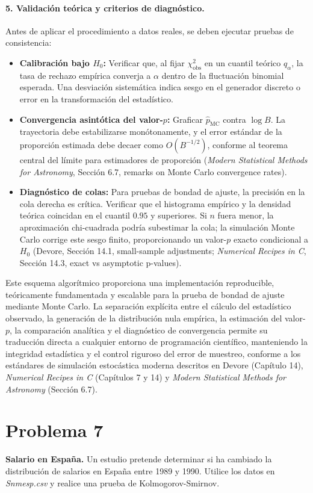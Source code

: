\documentclass[12pt]{article}
\begin{document}
\paragraph{5. Validación teórica y criterios de diagnóstico.}
Antes de aplicar el procedimiento a datos reales, se deben ejecutar pruebas de consistencia:
\begin{itemize}
    \item \textbf{Calibración bajo $H_0$:} Verificar que, al fijar $\chi^2_{\text{obs}}$ en un cuantil teórico $q_\alpha$, la tasa de rechazo empírica converja a $\alpha$ dentro de la fluctuación binomial esperada. Una desviación sistemática indica sesgo en el generador discreto o error en la transformación del estadístico.
    \item \textbf{Convergencia asintótica del valor-$p$:} Graficar $\hat{p}_{\text{MC}}$ contra $\log B$. La trayectoria debe estabilizarse monótonamente, y el error estándar de la proporción estimada debe decaer como $O(B^{-1/2})$, conforme al teorema central del límite para estimadores de proporción (\textit{Modern Statistical Methods for Astronomy}, Sección 6.7, remarks on Monte Carlo convergence rates).
    \item \textbf{Diagnóstico de colas:} Para pruebas de bondad de ajuste, la precisión en la cola derecha es crítica. Verificar que el histograma empírico y la densidad teórica coincidan en el cuantil $0.95$ y superiores. Si $n$ fuera menor, la aproximación chi-cuadrada podría subestimar la cola; la simulación Monte Carlo corrige este sesgo finito, proporcionando un valor-$p$ exacto condicional a $H_0$ (Devore, Sección 14.1, small-sample adjustments; \textit{Numerical Recipes in C}, Sección 14.3, exact vs asymptotic p-values).
\end{itemize}
Este esquema algorítmico proporciona una implementación reproducible, teóricamente fundamentada y escalable para la prueba de bondad de ajuste mediante Monte Carlo. La separación explícita entre el cálculo del estadístico observado, la generación de la distribución nula empírica, la estimación del valor-$p$, la comparación analítica y el diagnóstico de convergencia permite su traducción directa a cualquier entorno de programación científico, manteniendo la integridad estadística y el control riguroso del error de muestreo, conforme a los estándares de simulación estocástica moderna descritos en Devore (Capítulo 14), \textit{Numerical Recipes in C} (Capítulos 7 y 14) y \textit{Modern Statistical Methods for Astronomy} (Sección 6.7).

\section*{Problema 7}
\textbf{Salario en España.} Un estudio pretende determinar si ha cambiado la distribución de salarios en España entre 1989 y 1990. Utilice los datos en \textit{Snmesp.csv} y realice una prueba de Kolmogorov-Smirnov.
\end{document}
